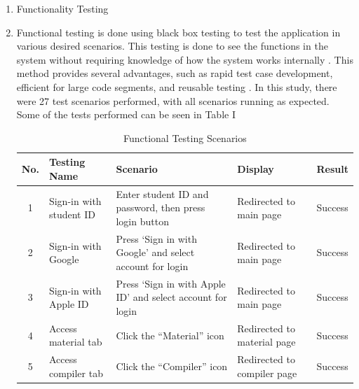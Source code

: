 \documentclass[conference,a4paper]{IEEEtran}
\begin{document}
\begin{enumerate}[label=\alph*.]
  \item Functionality Testing
  \item [] Functional testing is done using black box testing to test the application in various desired scenarios. This testing is done to see the functions in the system without requiring knowledge of how the system works internally \cite{b23}. This method provides several advantages, such as rapid test case development, efficient for large code segments, and reusable testing \cite{b24}. In this study, there were 27 test scenarios performed, with all scenarios running as expected. Some of the tests performed can be seen in Table I

        \begin{table}[H]
          \centering
          \scriptsize
          \caption{Functional Testing Scenarios}
          \label{tab:functional-part1}
          \begin{tabular}{|c|p{1cm}|p{2cm}|p{2cm}|p{1cm}|}
            \hline
            \textbf{No.} & \textbf{Testing Name}   & \textbf{Scenario}                                          & \textbf{Display}                  & \textbf{Result} \\ \hline
            1            & Sign-in with student ID & Enter student ID and password, then press login button     & Redirected to main page           & Success         \\ \hline
            2            & Sign-in with Google     & Press ‘Sign in with Google’ and select account for login   & Redirected to main page           & Success         \\ \hline
            3            & Sign-in with Apple ID   & Press ‘Sign in with Apple ID’ and select account for login & Redirected to main page           & Success         \\ \hline
            4            & Access material tab     & Click the “Material” icon                                  & Redirected to material page       & Success         \\ \hline
            5            & Access compiler tab     & Click the “Compiler” icon                                  & Redirected to compiler page       & Success         \\ \hline
           
          \end{tabular}
        \end{table}


\end{enumerate}
\end{document}
